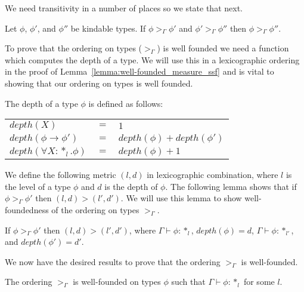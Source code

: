 \noindent
We need transitivity in a number of places so we state that next.

\begin{lemma}
  Let $\phi$, $\phi'$, and $\phi''$ be kindable types.  If $\phi >_\Gamma \phi'$ and 
  $\phi' >_\Gamma \phi''$ then $\phi >_\Gamma \phi''$.
  \label{lemma:transitivity_ssf}
\end{lemma}

\noindent
To prove that the ordering on types ($>_\Gamma$) is well founded we need
a function which computes the depth of a type.  We will use this in a
lexicographic ordering in the proof of
Lemma~\ref{lemma:well-founded_measure_ssf} and is vital to showing
that our ordering on types is well founded.

\begin{definition}
  The depth of a type $\phi$ is defined as follows:
  \begin{center}
    \begin{tabular}{lll}
      $depth(X)$                  & $=$ & $1$\\
      $depth(\phi \to \phi')$     & $=$ & $depth(\phi) + depth(\phi')$\\
      $depth(\forall X:*_l.\phi)$ & $=$ & $depth(\phi) + 1$\\
    \end{tabular}
  \end{center}
\end{definition}

We define the following metric $(l,d)$ in lexicographic combination,
where $l$ is the level of a type $\phi$ and $d$ is the depth of
$\phi$.  The following lemma shows that if $\phi >_\Gamma \phi'$ then
$(l,d) > (l',d')$.  We will use this lemma to show well-foundedness of
the ordering on types $>_\Gamma$.  

\begin{lemma}
  \label{lemma:well-founded_measure_ssf}
  If $\phi >_\Gamma \phi'$ then $(l,d) > (l',d')$, where $\Gamma \vdash \phi:*_l$, 
  $depth(\phi) = d$,  $\Gamma \vdash \phi:*_{l'}$, and $depth(\phi') = d'$.
\end{lemma}

\noindent We now have the desired results to prove that the ordering $>_\Gamma$ is 
well-founded.

\begin{thm}
  The ordering $>_\Gamma$ is well-founded on types $\phi$ such that 
  $\Gamma \vdash \phi:*_l$ for some $l$.
  \label{thm:well-founded_ordering_ssf}
\end{thm}

